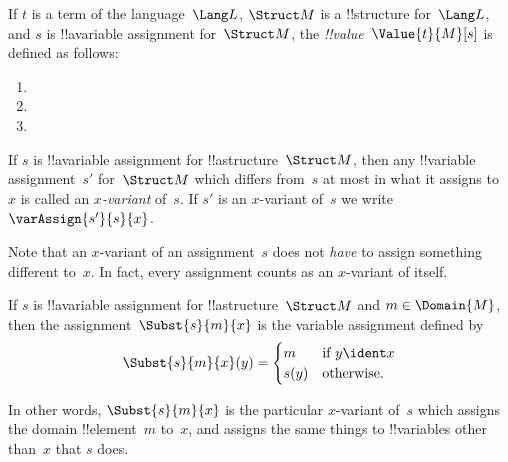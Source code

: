 \begin{defn}
If $t$ is a term of the language~$\Lang L$, $\Struct M$ is a
!!{structure} for~$\Lang L$, and $s$ is !!a{variable} assignment
for~$\Struct M$, the \emph{!!{value}}~$\Value{t}{M}[s]$ is defined as
follows:
\begin{enumerate}
\item {}
\item {}
\item {}
\end{enumerate}
\end{defn}

\begin{defn}[$x$-Variant]
If $s$ is !!a{variable} assignment for !!a{structure}~$\Struct M$, then any
!!{variable} assignment~$s'$ for~$\Struct M$ which differs from~$s$ at most
in what it assigns to~$x$ is called an \emph{$x$-variant} of~$s$.  If
$s'$ is an $x$-variant of~$s$ we write $\varAssign{s'}{s}{x}$.
\end{defn}

\begin{explain}
Note that an $x$-variant of an assignment~$s$ does not \emph{have} to
assign something different to~$x$.  In fact, every assignment counts
as an $x$-variant of itself.
\end{explain}

\begin{defn}
  If $s$ is !!a{variable} assignment for !!a{structure}~$\Struct M$
  and $m \in \Domain{M}$, then the assignment~$\Subst{s}{m}{x}$ is the
  variable assignment defined by
  \[\Subst{s}{m}{x}(y) = \begin{cases}
    m & \text{if } y \ident x\\
    s(y) & \text{otherwise}.
  \end{cases}\]
\end{defn}

In other words, $\Subst{s}{m}{x}$ is the particular $x$-variant of~$s$
which assigns the domain !!{element}~$m$ to~$x$, and assigns the same
things to !!{variable}s other than~$x$ that $s$ does.

